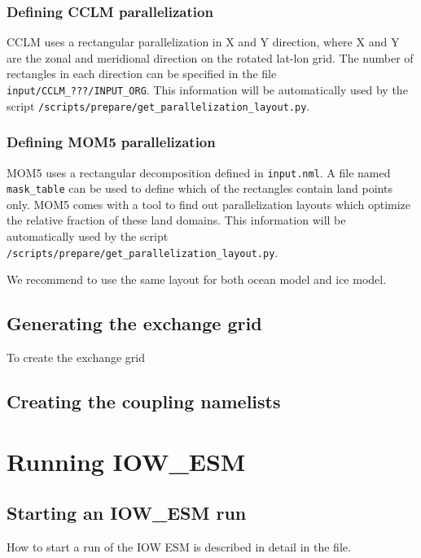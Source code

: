 \documentclass[a4paper,titlepage]{scrartcl}
\begin{document}
\subsubsection{Defining CCLM parallelization}
CCLM uses a rectangular parallelization in X and Y direction, where X and Y are the zonal and meridional direction on the rotated lat-lon grid. 
The number of rectangles in each direction can be specified in the file \texttt{input/CCLM\_\color{red}???\color{black}/INPUT\_ORG}.
This information will be automatically used by the script \texttt{/scripts/prepare/get\_parallelization\_layout.py}.


\subsubsection{Defining MOM5 parallelization}
MOM5 uses a rectangular decomposition defined in \texttt{input.nml}. 
A file named \texttt{mask\_table} can be used to define which of the rectangles contain land points only.
MOM5 comes with a tool to find out parallelization layouts which optimize the relative fraction of these land domains.
This information will be automatically used by the script \texttt{/scripts/prepare/get\_parallelization\_layout.py}.

We recommend to use the same layout for both ocean model and ice model.


\subsection{Generating the exchange grid}
To create the exchange grid

\subsection{Creating the coupling namelists}


\newpage
\section{Running IOW\_ESM}
\subsection{Starting an IOW\_ESM run}

How to start a run of the IOW ESM is described in detail in the \Readme file.
\end{document}
